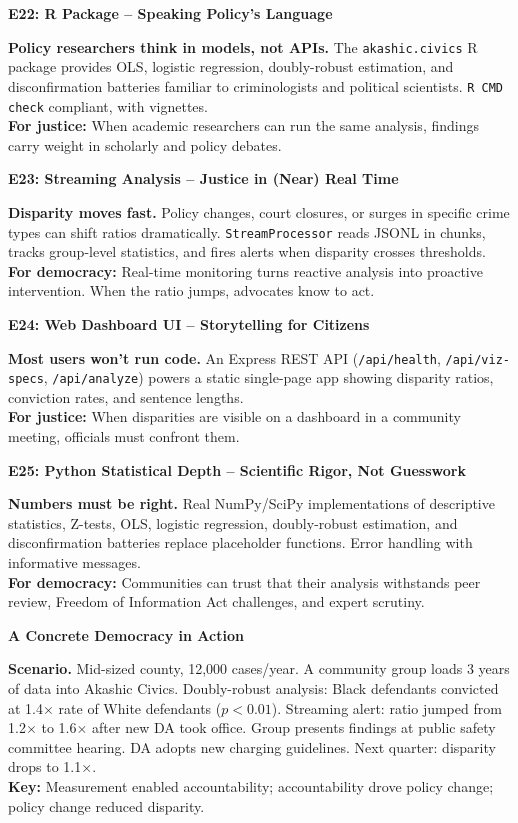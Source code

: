 \documentclass[11pt]{article}
\newcommand{\slide}[1]{\vspace{0.4em}\noindent\textbf{#1}\vspace{0.2em}}
\begin{document}
\slide{E22: R Package -- Speaking Policy's Language}

\textbf{Policy researchers think in models, not APIs.}  The \texttt{akashic.civics} R package provides OLS, logistic regression, doubly-robust estimation, and disconfirmation batteries familiar to criminologists and political scientists.  \texttt{R CMD check} compliant, with vignettes.  \\
\textbf{For justice:} When academic researchers can run the same analysis, findings carry weight in scholarly and policy debates.

\slide{E23: Streaming Analysis -- Justice in (Near) Real Time}

\textbf{Disparity moves fast.}  Policy changes, court closures, or surges in specific crime types can shift ratios dramatically.  \texttt{StreamProcessor} reads JSONL in chunks, tracks group-level statistics, and fires alerts when disparity crosses thresholds.  \\
\textbf{For democracy:} Real-time monitoring turns reactive analysis into proactive intervention.  When the ratio jumps, advocates know to act.

\slide{E24: Web Dashboard UI -- Storytelling for Citizens}

\textbf{Most users won't run code.}  An Express REST API (\texttt{/api/health}, \texttt{/api/viz-specs}, \texttt{/api/analyze}) powers a static single-page app showing disparity ratios, conviction rates, and sentence lengths.  \\
\textbf{For justice:} When disparities are visible on a dashboard in a community meeting, officials must confront them.

\slide{E25: Python Statistical Depth -- Scientific Rigor, Not Guesswork}

\textbf{Numbers must be right.}  Real NumPy/SciPy implementations of descriptive statistics, Z-tests, OLS, logistic regression, doubly-robust estimation, and disconfirmation batteries replace placeholder functions.  Error handling with informative messages.  \\
\textbf{For democracy:} Communities can trust that their analysis withstands peer review, Freedom of Information Act challenges, and expert scrutiny.

\slide{A Concrete Democracy in Action}

\textbf{Scenario.}  Mid-sized county, 12,000 cases/year.  A community group loads 3 years of data into Akashic Civics.  Doubly-robust analysis: Black defendants convicted at 1.4$\times$ rate of White defendants ($p<0.01$).  Streaming alert: ratio jumped from 1.2$\times$ to 1.6$\times$ after new DA took office.  Group presents findings at public safety committee hearing.  DA adopts new charging guidelines.  Next quarter: disparity drops to 1.1$\times$.\\[0.5em]
\textbf{Key:} Measurement enabled accountability; accountability drove policy change; policy change reduced disparity.
\end{document}
